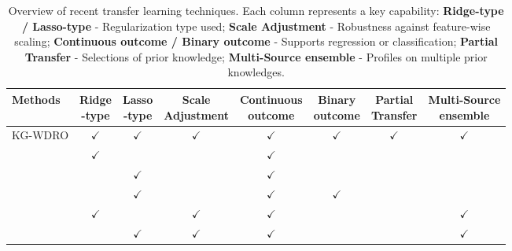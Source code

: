 \documentclass[12pt]{article}
\begin{document}
\begin{table*}[!ht]
\caption{Overview of recent transfer learning techniques. Each column represents a key capability:  
\textbf{Ridge-type / Lasso-type} - Regularization type used;  
\textbf{Scale Adjustment} - Robustness against feature-wise scaling;  
\textbf{Continuous outcome / Binary outcome} - Supports regression or classification;  
\textbf{Partial Transfer} - Selections of prior knowledge;  
\textbf{Multi-Source ensemble} - Profiles on multiple prior knowledges.}
\label{tab:comparison}
\vskip 0.1in
\begin{center}
\begin{small}
\setlength{\tabcolsep}{3pt} %
\renewcommand{\arraystretch}{1.1} %
\begin{tabular}{lccccccc}
\toprule
Methods & \makecell{Ridge \\ -type}  & \makecell{Lasso \\ -type} & \makecell{Scale \\ Adjustment} & \makecell{Continuous \\ outcome} & \makecell{Binary \\ outcome} & \makecell{Partial \\ Transfer} & \makecell{Multi-Source \\ ensemble} \\
\midrule
KG-WDRO   & $\checkmark$ & $\checkmark$ & $\checkmark$ & $\checkmark$ &  $\checkmark$ & $\checkmark$& $\checkmark$\\
\citet{bastani2020predicting} & $\checkmark$ &  & & $\checkmark$ & & & \\
\citet{li2021translasso} & & $\checkmark$ &  & $\checkmark$ &   &  &  \\
\citet{tian2023transglm} &  & $\checkmark$ & & $\checkmark$ &  $\checkmark$ &  &  \\
\citet{gu2024angle-based} & $\checkmark$ &  & $\checkmark$ & $\checkmark$ &  &  & $\checkmark$ \\
\citet{lin2024profiled} &  & $\checkmark$ & $\checkmark$ & $\checkmark$ &   &  & $\checkmark$ \\
\bottomrule
\end{tabular}
\end{small}
\end{center}
\end{table*}
\end{document}

